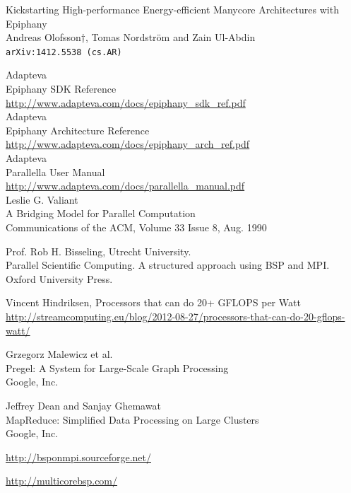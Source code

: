 \documentclass[fleqn]{article}
\renewcommand{\(}{\left(}
\renewcommand{\)}{\right)}
\begin{document}
\newpage

\begin{thebibliography}{9}

    Kickstarting High-performance Energy-efficient Manycore Architectures with Epiphany\\
    Andreas Olofsson†, Tomas Nordström and Zain Ul-Abdin\\
    \texttt{arXiv:1412.5538 (cs.AR)}

    Adapteva\\
    Epiphany SDK Reference\\
    \url{http://www.adapteva.com/docs/epiphany_sdk_ref.pdf}\\

    Adapteva\\
    Epiphany Architecture Reference\\
    \url{http://www.adapteva.com/docs/epiphany_arch_ref.pdf}\\

    Adapteva\\
    Parallella User Manual\\
    \url{http://www.adapteva.com/docs/parallella_manual.pdf}\\

    Leslie G. Valiant\\
    A Bridging Model for Parallel Computation\\
    Communications of the ACM, Volume 33 Issue 8, Aug. 1990

    Prof. Rob H. Bisseling, Utrecht University.\\
    Parallel Scientific Computing. A structured approach using BSP and MPI.\\
    Oxford University Press.

    Vincent Hindriksen, Processors that can do 20+ GFLOPS per Watt\\
    \url{http://streamcomputing.eu/blog/2012-08-27/processors-that-can-do-20-gflops-watt/}

    Grzegorz Malewicz et al.\\
    Pregel: A System for Large-Scale Graph Processing\\
    Google, Inc. 

    Jeffrey Dean and Sanjay Ghemawat\\
    MapReduce: Simplified Data Processing on Large Clusters\\
    Google, Inc.

    \url{http://bsponmpi.sourceforge.net/}

    \url{http://multicorebsp.com/}

\end{thebibliography}
\end{document}
